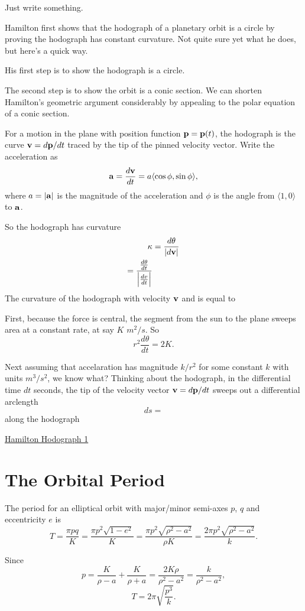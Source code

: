 \documentclass{ximera}
\begin{document}
Just write something.

Hamilton first shows that the hodograph of a planetary orbit is a circle by proving the hodograph has constant curvature. Not quite sure yet what he does, but here's a quick way.

His first step is to show the hodograph is a circle. 

The second step is to show the orbit is a conic section. We can shorten Hamilton's geometric argument considerably by appealing to the polar equation of a conic section.

For a motion in the plane with position function ${\bf p} = {\bf p}(t)$, the hodograph is the curve ${\bf v} =d{\bf p}/dt$ traced by the tip of the pinned velocity vector. Write the acceleration as
\[
   {\bf a} = \frac{d{\bf v}}{dt} =  a \langle \cos\phi , \sin \phi   \rangle ,
\]
where $a=|{\bf a}|$ is the magnitude of the acceleration and $\phi$ is the angle from $\langle 1, 0 \rangle$ to ${\bf a}$. 

So the hodograph has curvature
\begin{align*}
      \kappa  &= \frac{d\theta}{|d{\bf v}|}  \\
         = \frac{\frac{d\theta}{dt}}{\Big| \frac{dv}{dt}  \Big|}
\end{align*}
The curvature of the hodograph with velocity ${\bf v}$ and  is equal to 

First, because the force is central, the segment from the sun to the plane sweeps area at a constant rate, at say $K$ $m^2/s$.  So
\[
   r^2 \frac{d\theta}{dt} = 2K .
\]

Next assuming that accelaration has magnitude $k/r^2$ for some constant $k$ with units $m^3/s^2$, we know what? Thinking about the hodograph, in the differential time $dt$ seconds, the tip of the velocity vector ${\bf v} = d{\bf p}/dt$ sweeps out a differential arclength
\[
  ds = 
\] 
along the hodograph




\begin{onlineOnly}
    \begin{center}
\end{center}
\end{onlineOnly}

\href{https://www.desmos.com/calculator/besggxgqus}{Hamilton Hodograph 1}



\section{The Orbital Period}

The period for an elliptical orbit with major/minor semi-axes $p$, $q$ and eccentricity $e$ is
\[
     T = \frac{\pi p q}{K} =   \frac{\pi  p^2\sqrt{1-e^2}}{K}  = \frac{\pi p^2 \sqrt{\rho^2 - a^2}}{\rho K} = \frac{2\pi p^2 \sqrt{\rho^2 - a^2}}{k}.
\]

Since
\[
    p = \frac{K}{\rho - a} + \frac{K}{\rho+a} = \frac{2K\rho}{\rho^2 - a^2} = \frac{k}{\rho^2 - a^2},
\]
\[
  T = 2\pi \sqrt{\frac{p^3}{k}} .
\]
\end{document}
